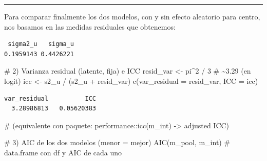 \documentclass[
  letterpaper,
  DIV=11,
  numbers=noendperiod]{scrartcl}
\newenvironment{Shaded}{\begin{snugshade}}{\end{snugshade}}
\newcommand{\AttributeTok}[1]{\textcolor[rgb]{0.40,0.45,0.13}{#1}}
\newcommand{\CommentTok}[1]{\textcolor[rgb]{0.37,0.37,0.37}{#1}}
\newcommand{\DecValTok}[1]{\textcolor[rgb]{0.68,0.00,0.00}{#1}}
\newcommand{\FunctionTok}[1]{\textcolor[rgb]{0.28,0.35,0.67}{#1}}
\newcommand{\NormalTok}[1]{\textcolor[rgb]{0.00,0.23,0.31}{#1}}
\newcommand{\OtherTok}[1]{\textcolor[rgb]{0.00,0.23,0.31}{#1}}
\newcommand{\SpecialCharTok}[1]{\textcolor[rgb]{0.37,0.37,0.37}{#1}}
\begin{document}
\begin{center}\rule{0.5\linewidth}{0.5pt}\end{center}

Para comparar finalmente los dos modelos, con y sin efecto aleatorio
para centro, nos basamos en las medidas residuales que obtenemos:

\begin{Shaded}
\end{Shaded}

\begin{verbatim}
 sigma2_u   sigma_u 
0.1959143 0.4426221 
\end{verbatim}

\begin{Shaded}
\begin{Highlighting}[]
\CommentTok{\# 2) Varianza residual (latente, fija) e ICC}
\NormalTok{resid\_var }\OtherTok{\textless{}{-}}\NormalTok{ pi}\SpecialCharTok{\^{}}\DecValTok{2} \SpecialCharTok{/} \DecValTok{3}       \CommentTok{\# \textasciitilde{}3.29  (en logit)}
\NormalTok{icc       }\OtherTok{\textless{}{-}}\NormalTok{ s2\_u }\SpecialCharTok{/}\NormalTok{ (s2\_u }\SpecialCharTok{+}\NormalTok{ resid\_var)}
\FunctionTok{c}\NormalTok{(}\AttributeTok{var\_residual =}\NormalTok{ resid\_var, }\AttributeTok{ICC =}\NormalTok{ icc)}
\end{Highlighting}
\end{Shaded}

\begin{verbatim}
var_residual          ICC 
  3.28986813   0.05620383 
\end{verbatim}

\begin{Shaded}
\begin{Highlighting}[]
\CommentTok{\# (equivalente con paquete:  performance::icc(m\_int)  {-}\textgreater{} \textquotesingle{}adjusted ICC\textquotesingle{})}

\CommentTok{\# 3) AIC de los dos modelos (menor = mejor)}
\FunctionTok{AIC}\NormalTok{(m\_pool, m\_int)          }\CommentTok{\# data.frame con df y AIC de cada uno}
\end{Highlighting}
\end{Shaded}
\end{document}
